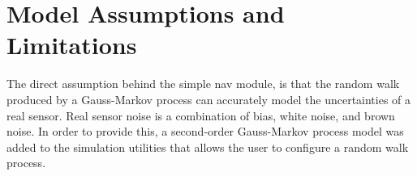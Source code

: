 \section{Model Assumptions and Limitations}

The direct assumption behind the simple nav module, is that the random walk produced by a Gauss-Markov process can accurately model the uncertainties of a real sensor. 
 Real sensor noise is a combination of bias, white noise, 
and brown noise.  In order to provide this, a second-order 
Gauss-Markov process model was added to the simulation utilities that allows 
the user to configure a random walk process. 